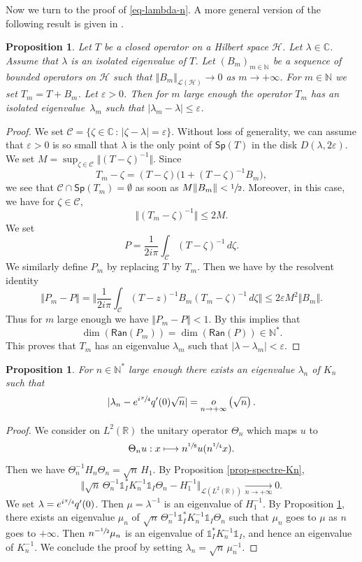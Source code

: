 \documentclass[JEP,XML,SOM,Unicode]{cedram}
\let\mathcal\mathscr
\def\mto{\mathchoice{\longmapsto}{\mapsto}{\mapsto}{\mapsto}}
\theoremstyle{plain}
\newtheorem{proposition}[theorem]{Proposition}
\theoremstyle{definition}
\newcommand {\limt}[2]{\xrightarrow[#1 \to #2]{}}
\newcommand{\abs}[1]{\vert #1\vert}
\newcommand{\nr}[1]{\Vert #1\Vert}
\newcommand{\bnr}[1]{\bigl\Vert #1\bigr\Vert}
\newcommand{\bbnr}[1]{\biggl\Vert #1\biggr\Vert}
\newcommand{\set}[1]{\{ #1\}}
\newcommand{\inv}{^{-1}}
\newcommand{\littleo}[2]{\mathop{o}\limits_{#1 \to #2}}
\newcommand{\1}{\mathds 1}
\newcommand{\st}{\,:\,}
\newcommand{\Sp}{\mathsf{Sp}}
\newcommand{\Ran}{\mathsf{Ran}}
\newcommand{\R}{\mathbb{R}}
\def\C{\mathbb{C}}
\newcommand{\N}{\mathbb{N}}
\let\e\varepsilon
\let\z\zeta
\let\Th\Theta
\let\l\lambda
\let\m\mu
\newcommand{\Hc}{{\mathcal H}}
\newcommand{\Lc}{{\mathcal L}}
\begin{document}
Now we turn to the proof of \eqref{eq-lambda-n}. A more general version of the following result is given in \cite[\S IV.3.5]{kato}.

\begin{proposition} \label{prop-perturbation-vp-kato}
Let $T$ be a closed operator on a Hilbert space $\Hc$. Let $\l \in \C$. Assume that $\l$ is an isolated eigenvalue of $T$. Let $(B_m)_{m \in \N}$ be a sequence of bounded operators on $\Hc$ such that $\nr{B_m}_{\Lc(\Hc)} \to 0$ as $m \to +\infty$. For $m \in \N$ we set \hbox{$T_m = T+B_m$}. Let $\e > 0$. Then for $m$ large enough the operator $T_m$ has an isolated eigenvalue~$\l_m$ such that $\abs{\l_m-\l} \leq \e$.
\end{proposition}

\begin{proof}
We set $\mathcal C = \set {\z \in \C\st \abs {\z - \l} = \e}$. Without loss of generality, we can assume that $\e> 0$ is so small that $\l$ is the only point of $\Sp(T)$ in the disk $D(\l,2\e)$. We set $M = \sup_{\z \in \mathcal C} \nr{(T-\z)\inv}$. Since
\[
T_m - \z = (T-\z) \bigl(1 + (T-\z)\inv B_m \bigr),
\]
we see that $\mathcal C \cap \Sp(T_m) = \emptyset$ as soon as $M \nr{B_m} < \sfrac 1 2$. Moreover, in this case, we have for $\z \in \mathcal C$,
\[
\nr{(T_m-\z)\inv} \leq 2 M.
\]
We set
\[
P = \frac 1 {2i\pi} \int_{\mathcal C} (T-\z)\inv \, d\z.
\]
We similarly define $P_m$ by replacing $T$ by $T_m$. Then we have by the resolvent identity
\[
\nr{P_m - P} = \bbnr{\frac 1 {2i\pi} \int_{\mathcal C} (T-z)\inv B_m (T_m-\z)\inv \, d\z} \leq 2\e M^2 \Vert B_m \Vert.
\]
Thus for $m$ large enough we have $\nr{P_m - P} < 1$. By \cite[\S I.4.6]{kato} this implies that
\[
\dim (\Ran (P_m)) = \dim (\Ran (P)) \in \N^*.
\]
This proves that $T_m$ has an eigenvalue $\l_m$ such that $\abs{\l - \l_m} < \e$.
\end{proof}

\begin{proposition} \label{prop-lambda-n}
For $n \in \N^*$ large enough there exists an eigenvalue $\l_n$ of $K_n$ such that
\[
\abs{\l_n -e^{i\sfrac \pi 4} q'(0) \sqrt n } = \littleo n {+\infty} \left(\sqrt n \right).
\]
\end{proposition}

\begin{proof}
We consider on $L^2(\R)$ the unitary operator $\Th_n$ which maps $u$ to
\[
\Th_n u : x \mto n^{\sfrac 18} u(n^{\sfrac 14} x).
\]
Then we have $\Th_n\inv H_n \Th_n = \sqrt n\,H_1$. By Proposition \ref{prop-spectre-Kn},
\[
\bnr{\sqrt n\,\Th_n\inv \1_I^* K_n\inv \1_I \Th_n - H_1\inv}_{\Lc(L^2(\R))} \limt n {+\infty} 0.
\]
We set $\l = e^{i\sfrac \pi 4} q'(0)$. Then $\m = \l\inv$ is an eigenvalue of $H_1\inv$. By Proposition \ref{prop-perturbation-vp-kato}, there exists an eigenvalue $\m_n$ of $\sqrt n\,\Th_n\inv \1_I^* K_n \inv \1_I \Th_n$ such that $\m_n$ goes to $\m$ as $n$ goes to $+\infty$. Then $n^{-\sfrac 12} \m_n$ is an eigenvalue of $\1_I^* K_n\inv \1_I$, and hence an eigenvalue of $K_n\inv$. We conclude the proof by setting $\l_n = \sqrt n\,\m_n\inv$.
\end{proof}
\end{document}
